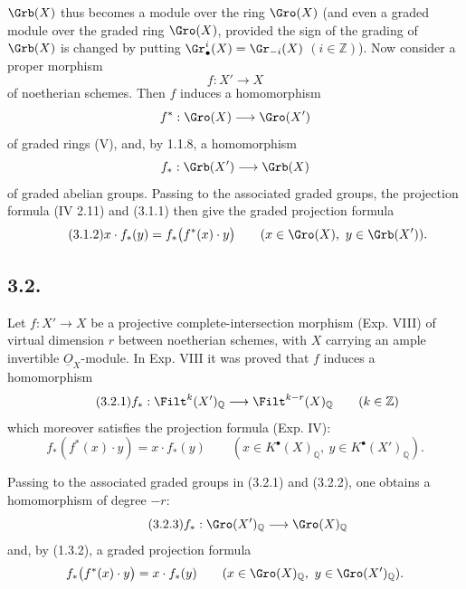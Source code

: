 %

\(\Grb(X)\) thus becomes a module over the ring \(\Gro(X)\) (and even a graded module over the graded ring \(\Gro(X)\), provided the sign of the grading of \(\Grb(X)\) is changed by putting \(\Gr^i_\bullet(X)=\Gr_{-i}(X)\) \((i\in\mathbb Z)\)).
Now consider a proper morphism
\[
 f:X'\longrightarrow X
\]
of noetherian schemes. Then \(f\) induces a homomorphism
\[
 f^*:\Gro(X)\longrightarrow\Gro(X')
\]
of graded rings (V), and, by 1.1.8, a homomorphism
\[
 f_*:\Grb(X')\longrightarrow\Grb(X)
\]
of graded abelian groups. Passing to the associated graded groups, the projection formula (IV 2.11) and (3.1.1) then give the graded projection formula
\begin{equation}\tag{3.1.2}
 x\cdot f_*(y)=f_*\bigl(f^*(x)\cdot y\bigr)
 \qquad (x\in\Gro(X),\ y\in\Grb(X')).
\end{equation}

\subsection*{3.2.}
Let \(f:X'\to X\) be a projective complete-intersection morphism (Exp. VIII) of virtual dimension \(r\) between noetherian schemes, with \(X\) carrying an ample invertible \(\underline{O}_X\)-module. In Exp. VIII it was proved that \(f\) induces a homomorphism
\begin{equation}\tag{3.2.1}
 f_*:\Filt^k(X')_{\mathbb Q}\longrightarrow\Filt^{k-r}(X)_{\mathbb Q}\qquad(k\in\mathbb Z)
\end{equation}
which moreover satisfies the projection formula (Exp. IV):
\begin{equation}\tag{3.2.2}
 f_*(f^*(x)\cdot y)=x\cdot f_*(y)
 \qquad (x\in K^{\bullet}(X)_{\mathbb Q},\ y\in K^{\bullet}(X')_{\mathbb Q}).
\end{equation}


%

Passing to the associated graded groups in (3.2.1) and (3.2.2), one obtains a homomorphism of degree \(-r\):
\begin{equation}\tag{3.2.3}
 f_*:\Gro(X')_{\mathbb Q}\longrightarrow\Gro(X)_{\mathbb Q}
\end{equation}
and, by (1.3.2), a graded projection formula
\[
 f_*\bigl(f^*(x)\cdot y\bigr)=x\cdot f_*(y)
 \qquad (x\in\Gro(X)_{\mathbb Q},\ y\in\Gro(X')_{\mathbb Q}).
\]

